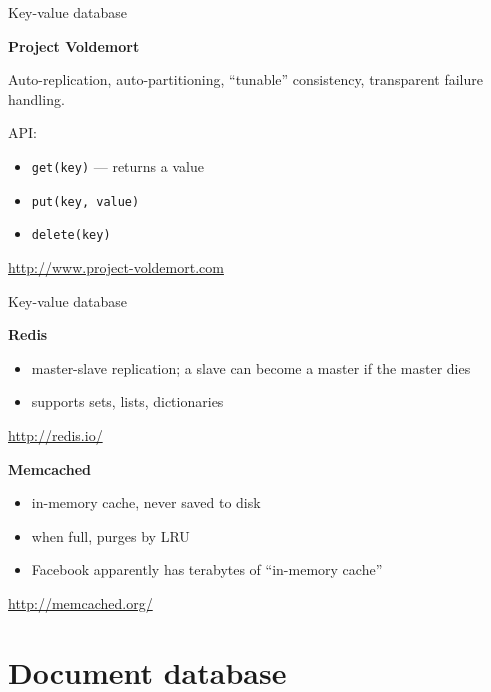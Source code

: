 \documentclass{beamer}
\begin{document}
\begin{frame}{Key-value database}

  \textbf{Project Voldemort}

  \vskip 0.25in

  Auto-replication, auto-partitioning, ``tunable'' consistency,
  transparent failure handling.

  \vskip 0.25in

  API:

  \begin{itemize}
  \item \texttt{get(key)} --- returns a value
  \item \texttt{put(key, value)}
  \item \texttt{delete(key)}
  \end{itemize}

  \vskip 0.15in

  \url{http://www.project-voldemort.com}

\end{frame}

\begin{frame}{Key-value database}

  \textbf{Redis}

  \vskip 0.05in

  \begin{itemize}
  \item master-slave replication; a slave can become a master if the master dies
  \item supports sets, lists, dictionaries
  \end{itemize}
  
  \url{http://redis.io/}

  \vskip 0.25in

  \textbf{Memcached}

  \vskip 0.05in

  \begin{itemize}
  \item in-memory cache, never saved to disk
  \item when full, purges by LRU
  \item Facebook apparently has terabytes of ``in-memory cache''
  \end{itemize}

  \url{http://memcached.org/}

\end{frame}

\section{Document database}
\end{document}
